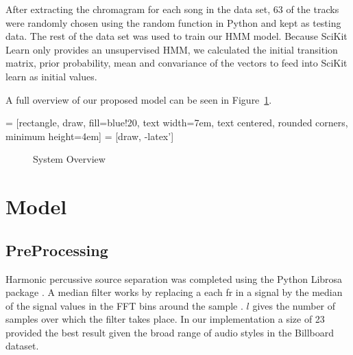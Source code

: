 \documentclass{article}
\begin{document}
After extracting the chromagram for each song in the data set, 63 of the tracks
were randomly chosen using the random function in Python and kept as testing
data. The rest of the data set was used to train our HMM model. Because SciKit
Learn only provides an unsupervised HMM, we calculated the initial transition
matrix, prior probability, mean and convariance of the vectors to feed into
SciKit learn as initial values.

A full overview of our proposed model can be seen in Figure~\ref{fig:overview}.

 = [rectangle, draw, fill=blue!20,
    text width=7em, text centered, rounded corners, minimum height=4em]
 = [draw, -latex']

\begin{figure}
\caption{System Overview}
\label{fig:overview}
\end{figure}

\section{Model}

\subsection{PreProcessing}

Harmonic percussive source separation was completed using the Python Librosa
package \cite{librosa:24}. A median filter works by replacing a each fr
in a signal by the median of the signal values in the FFT bins around the
sample \cite{FitzGerald:11}.  $l$ gives the number of samples over which the
filter takes place. In our implementation a size of 23 provided the best result
given the broad range of audio styles in the Billboard dataset.
\end{document}
